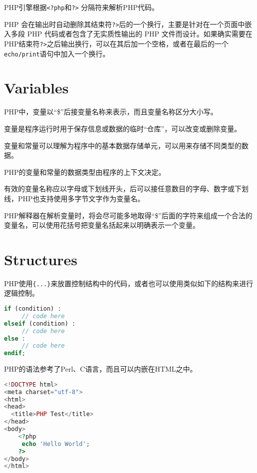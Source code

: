 PHP引擎根据\texttt{<?php}和\texttt{?>} 分隔符来解析PHP代码。

PHP 会在输出时自动删除其结束符\texttt{?>}后的一个换行，主要是针对在一个页面中嵌入多段 PHP 代码或者包含了无实质性输出的 PHP 文件而设计。如果确实需要在PHP结束符\texttt{?>}之后输出换行，可以在其后加一个空格，或者在最后的一个\texttt{echo/print}语句中加入一个换行。

\section{Variables}


PHP中，变量以“\$”后接变量名称来表示，而且变量名称区分大小写。

\begin{compactitem}
\item 变量是程序运行时用于保存信息或数据的临时“仓库”，可以改变或删除变量。
\item 变量和常量可以理解为程序中的基本数据存储单元，可以用来存储不同类型的数据。
\item PHP的变量和常量的数据类型由程序的上下文决定。
\end{compactitem}




有效的变量名称应以字母或下划线开头，后可以接任意数目的字母、数字或下划线，PHP也支持使用多字节文字作为变量名。

PHP解释器在解析变量时，将会尽可能多地取得“\$”后面的字符来组成一个合法的变量名，可以使用花括号把变量名括起来以明确表示一个变量。





\section{Structures}


PHP使用\texttt{\{...\}}来放置控制结构中的代码，或者也可以使用类似如下的结构来进行逻辑控制。

\begin{lstlisting}[language=PHP]
if (condition) :
     // code here
elseif (condition) :
     // code here
else :
     // code here
endif;
\end{lstlisting}






PHP的语法参考了Perl、C语言，而且可以内嵌在HTML之中。

\begin{lstlisting}[language=PHP]
<!DOCTYPE html>
<meta charset="utf-8">
<html>
<head>
  <title>PHP Test</title>
</head>
<body>
	<?php
	 echo 'Hello World';
	?>
</body>
</html>
\end{lstlisting}

